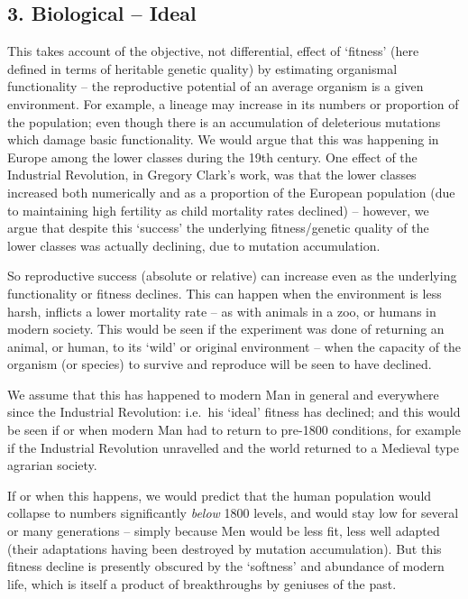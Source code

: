 \documentclass[
]{book}
\begin{document}
\hypertarget{biological-ideal}{%
\subsection*{3. Biological -- Ideal}\label{biological-ideal}}

This takes account of the objective, not differential, effect of `fitness' (here defined in terms of heritable genetic quality) by estimating organismal functionality -- the reproductive potential of an average organism is a given environment.
For example, a lineage may increase in its numbers or proportion of the population; even though there is an accumulation of deleterious mutations which damage basic functionality. We would argue that this was happening in Europe among the lower classes during the 19th century. One effect of the Industrial Revolution, in Gregory Clark's work, was that the lower classes increased both numerically and as a proportion of the European population (due to maintaining high fertility as child mortality rates declined) -- however, we argue that despite this `success' the underlying fitness/genetic quality of the lower classes was actually declining, due to mutation accumulation.

So reproductive success (absolute or relative) can increase even as the underlying functionality or fitness declines. This can happen when the environment is less harsh, inflicts a lower mortality rate -- as with animals in a zoo, or humans in modern society. This would be seen if the experiment was done of returning an animal, or human, to its `wild' or original environment -- when the capacity of the organism (or species) to survive and reproduce will be seen to have declined.

We assume that this has happened to modern Man in general and everywhere since the Industrial Revolution: i.e.~his `ideal' fitness has declined; and this would be seen if or when modern Man had to return to pre-1800 conditions, for example if the Industrial Revolution unravelled and the world returned to a Medieval type agrarian society.

If or when this happens, we would predict that the human population would collapse to numbers significantly \emph{below} 1800 levels, and would stay low for several or many generations -- simply because Men would be less fit, less well adapted (their adaptations having been destroyed by mutation accumulation). But this fitness decline is presently obscured by the `softness' and abundance of modern life, which is itself a product of breakthroughs by geniuses of the past.
\end{document}
